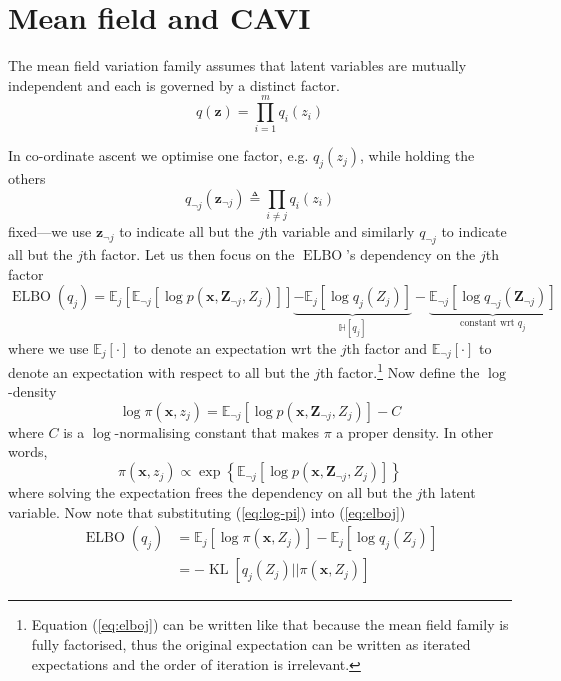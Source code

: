 \documentclass[11pt]{article}
\DeclareMathOperator{\KL}{KL}
\DeclareMathOperator{\ELBO}{ELBO}
\newcommand{\E}[2]{\ensuremath{\mathbb E_{#1}\left[ #2 \right]}}
\newcommand{\Eneg}[2]{\ensuremath{\mathbb E_{\neg #1}\left[ #2 \right]}}
\newcommand{\x}{\ensuremath{\mathbf x}}
\newcommand{\z}{\ensuremath{\mathbf z}}
\newcommand{\zi}{\ensuremath{z_{i}}}
\newcommand{\zj}{\ensuremath{z_{j}}}
\newcommand{\znj}{\ensuremath{\mathbf z_{\neg j}}}
\newcommand{\Zj}{\ensuremath{Z_{j}}}
\newcommand{\Znj}{\ensuremath{\mathbf Z_{\neg j}}}
\newcommand{\qi}{\ensuremath{q_{i}}}
\newcommand{\qj}{\ensuremath{q_{j}}}
\newcommand{\qnj}{\ensuremath{q_{\neg j}}}
\begin{document}
\section{Mean field and CAVI}

The mean field variation family assumes that latent variables are mutually independent and each is governed by a distinct factor.
\begin{equation}\label{eq:mean-field}
q(\z) = \prod_{i=1}^m \qi(\zi)
\end{equation}

In co-ordinate ascent we optimise one factor, e.g. $\qj(\zj)$, while holding the others \begin{equation}
\qnj(\znj) \triangleq \prod_{i\neq j} \qi(\zi)
\end{equation}
fixed---we use $\znj$ to indicate all but the $j$th variable and similarly $\qnj$ to indicate all but the $j$th factor.
Let us then focus on the $\ELBO$'s dependency on the $j$th factor
\begin{equation}\label{eq:elboj}
\ELBO(\qj) = \E{j}{ \Eneg{j}{\log p(\x, \Znj, \Zj)} } \underbrace{- \E{j}{ \log \qj(\Zj)}}_{\mathbb H[\qj]} - \underbrace{\Eneg{j}{ \log \qnj(\Znj) }}_{\text{constant wrt }\qj}
\end{equation}
where we use $\E{j}{\cdot}$ to denote an expectation wrt the $j$th factor and $\Eneg{j}{\cdot}$ to denote an expectation with respect to all but the $j$th factor.\footnote{Equation (\ref{eq:elboj}) can be written like that because the mean field family is fully factorised, thus the original expectation can be written as iterated expectations and the order of iteration is irrelevant.}
Now define the $\log$-density
\begin{equation}\label{eq:log-pi}
\log \pi(\x, \zj) = \Eneg{j}{ \log p(\x, \Znj, \Zj)} - C
\end{equation}
where $C$ is a $\log$-normalising constant that makes $\pi$ a proper density.
In other words, 
\begin{equation}
\pi(\x, \zj) \propto \exp\left\{ \Eneg{j}{ \log p(\x, \Znj, \Zj)} \right\} 
\end{equation}
where solving the expectation frees the dependency on all but the $j$th latent variable. 
Now note that substituting (\ref{eq:log-pi}) into (\ref{eq:elboj}) 
\begin{subequations}
\begin{align}
\ELBO(\qj) &= \E{j}{ \log \pi(\x, \Zj) } - \E{j}{\log \qj(\Zj)} \\
&= -\KL\left[ \qj(\Zj) || \pi(\x, \Zj)\right] \label{eq:KLj}
\end{align}
\end{subequations}
\end{document}
